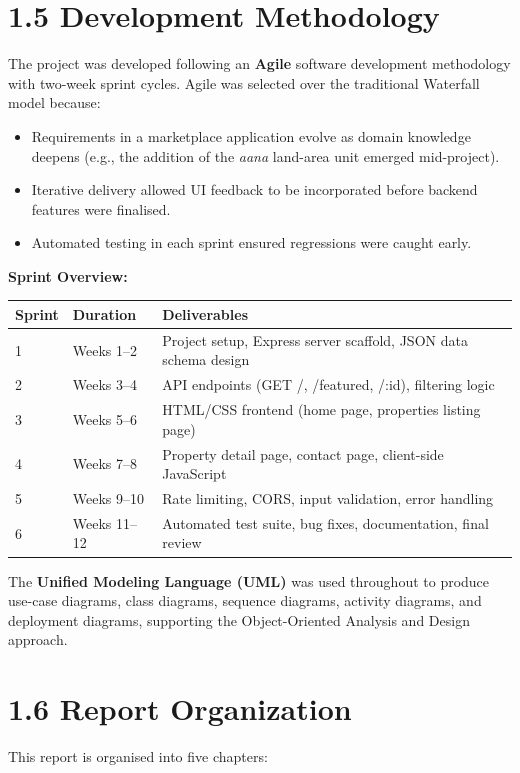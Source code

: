 \documentclass[12pt,a4paper]{report}
\begin{document}
\section{1.5 Development Methodology}
The project was developed following an \textbf{Agile} software development methodology with two-week sprint cycles. Agile was selected over the traditional Waterfall model because:

\begin{itemize}
  \item \textbullet{} Requirements in a marketplace application evolve as domain knowledge deepens (e.g., the addition of the \textit{aana} land-area unit emerged mid-project).
  \item \textbullet{} Iterative delivery allowed UI feedback to be incorporated before backend features were finalised.
  \item \textbullet{} Automated testing in each sprint ensured regressions were caught early.
\end{itemize}
\textbf{Sprint Overview:}


\begin{center}
\begin{tabular}{|l|l|l|}
\hline
Sprint & Duration & Deliverables \\
\hline
1 & Weeks 1--2 & Project setup, Express server scaffold, JSON data schema design \\
\hline
2 & Weeks 3--4 & API endpoints (GET /, /featured, /:id), filtering logic \\
\hline
3 & Weeks 5--6 & HTML/CSS frontend (home page, properties listing page) \\
\hline
4 & Weeks 7--8 & Property detail page, contact page, client-side JavaScript \\
\hline
5 & Weeks 9--10 & Rate limiting, CORS, input validation, error handling \\
\hline
6 & Weeks 11--12 & Automated test suite, bug fixes, documentation, final review \\
\hline
\end{tabular}
\end{center}

The \textbf{Unified Modeling Language (UML)} was used throughout to produce use-case diagrams, class diagrams, sequence diagrams, activity diagrams, and deployment diagrams, supporting the Object-Oriented Analysis and Design approach.

\section{1.6 Report Organization}
This report is organised into five chapters:
\end{document}
